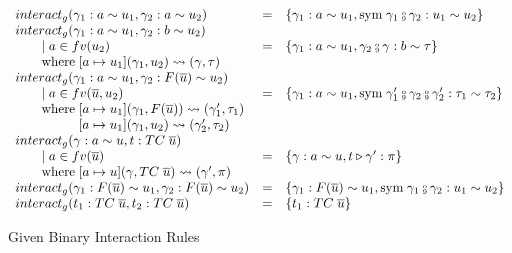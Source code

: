 \begin{figure}
\[
\begin{array}{l c l}
interact_g(\gamma_1 : a \sim u_1, \gamma_2 : a \sim u_2) &=& \{\gamma_1 : a \sim
u_1, \text{sym} \; \gamma_1 \fctrans \gamma_2 : u_1 \sim u_2\}
\\
interact_g(\gamma_1 : a \sim u_1, \gamma_2 : b \sim u_2)
\\ \guard a \in fv(u_2 )&=& \{\gamma_1 : a  \sim u_1, \gamma_2 \fctrans \gamma :
b \sim \tau\}
\\ \where [a \mapsto u_1](\gamma_1, u_2) \rightsquigarrow (\gamma, \tau)
\\
interact_g(\gamma_1 : a \sim u_1, \gamma_2 : F(\overline{u}) \sim u_2)
\\ \guard a \in fv(\overline{u}, u_2) &=& \{\gamma_1 : a \sim u_1, \text{sym} \;
\gamma_1' \fctrans \gamma_2 \fctrans \gamma_2': \tau_1 \sim \tau_2\}
\\ \where [a \mapsto u_1](\gamma_1, F(\overline{u})) \rightsquigarrow
(\gamma_1', \tau_1)
\\ \whereindent [a \mapsto u_1](\gamma_1, u_2) \rightsquigarrow
(\gamma_2', \tau_2)
\\
interact_g(\gamma : a \sim u, t : TC \; \overline{u})
\\ \qquad \mid a \in fv(\overline{u}) &=& \{\gamma : a \sim u, t \triangleright
\gamma' : \pi\}
\\ \where [a \mapsto u](\gamma, TC \; \overline{u}) \rightsquigarrow
(\gamma', \pi)
\\
interact_g(\gamma_1 : F(\overline{u}) \sim u_1, \gamma_2 : F(\overline{u}) \sim
u_2) &=& \{\gamma_1 : F(\overline{u}) \sim u_1, \text{sym} \; \gamma_1 \fctrans
\gamma_2: u_1 \sim u_2\}
\\
interact_g(t_1 : TC \; \overline{u}, t_2 : TC \; \overline{u}) &=& \{t_1 : TC \;
\overline{u}\}
\end{array}
\]
\caption{Given Binary Interaction Rules}
\end{figure}

